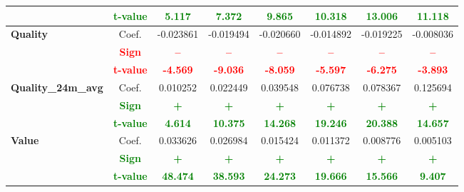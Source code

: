 \documentclass[11pt,english,a4paper,hidelinks]{book}
\begin{document}
\begin{table}[H]
\begin{tabular}{lccccccc}
            & \textbf{\textcolor{green}{t-value}} & \textbf{\textcolor{green}{5.117}}     & \textbf{\textcolor{green}{7.372}}     & \textbf{\textcolor{green}{9.865}}     & \textbf{\textcolor{green}{10.318}}    & \textbf{\textcolor{green}{13.006}}    & \textbf{\textcolor{green}{11.118}}    \\
        \midrule
        \multirow{3}{*}{\textbf{Quality}}
            & Coef.   & -0.023861 & -0.019494 & -0.020660 & -0.014892 & -0.019225 & -0.008036 \\
            & \textbf{\textcolor{red}{Sign}}    & \textbf{\textcolor{red}{–}}         & \textbf{\textcolor{red}{–}}         & \textbf{\textcolor{red}{–}}         & \textbf{\textcolor{red}{–}}         & \textbf{\textcolor{red}{–}}         & \textbf{\textcolor{red}{–}}         \\
            & \textbf{\textcolor{red}{t-value}} & \textbf{\textcolor{red}{-4.569}}    & \textbf{\textcolor{red}{-9.036}}    & \textbf{\textcolor{red}{-8.059}}    & \textbf{\textcolor{red}{-5.597}}    & \textbf{\textcolor{red}{-6.275}}    & \textbf{\textcolor{red}{-3.893}}    \\
        \multirow{3}{*}{\textbf{Quality\_24m\_avg}}
            & Coef.   & 0.010252 & 0.022449 & 0.039548 & 0.076738 & 0.078367 & 0.125694 \\
            & \textbf{\textcolor{green}{Sign}}    & \textbf{\textcolor{green}{+}}        & \textbf{\textcolor{green}{+}}        & \textbf{\textcolor{green}{+}}        & \textbf{\textcolor{green}{+}}        & \textbf{\textcolor{green}{+}}        & \textbf{\textcolor{green}{+}}        \\
            & \textbf{\textcolor{green}{t-value}} & \textbf{\textcolor{green}{4.614}}    & \textbf{\textcolor{green}{10.375}}   & \textbf{\textcolor{green}{14.268}}   & \textbf{\textcolor{green}{19.246}}   & \textbf{\textcolor{green}{20.388}}   & \textbf{\textcolor{green}{14.657}}   \\
        \midrule
        \multirow{3}{*}{\textbf{Value}}
            & Coef.   & 0.033626  & 0.026984  & 0.015424  & 0.011372  & 0.008776  & 0.005103  \\
            & \textbf{\textcolor{green}{Sign}}    & \textbf{\textcolor{green}{+}}        & \textbf{\textcolor{green}{+}}        & \textbf{\textcolor{green}{+}}        & \textbf{\textcolor{green}{+}}        & \textbf{\textcolor{green}{+}}        & \textbf{\textcolor{green}{+}}        \\
            & \textbf{\textcolor{green}{t-value}} & \textbf{\textcolor{green}{48.474}}    & \textbf{\textcolor{green}{38.593}}    & \textbf{\textcolor{green}{24.273}}    & \textbf{\textcolor{green}{19.666}}    & \textbf{\textcolor{green}{15.566}}    & \textbf{\textcolor{green}{9.407}}    \\

\end{tabular}
\end{table}
\end{document}
